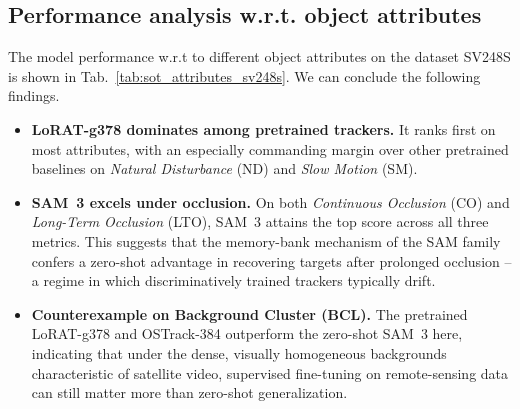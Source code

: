 \documentclass{article}
\begin{document}
\subsection{Performance analysis w.r.t. object attributes}
The model performance w.r.t to different object attributes on the dataset SV248S
is shown in Tab.~\ref{tab:sot_attributes_sv248s}. We can conclude the following
findings.
\begin{itemize}
    \item \textbf{LoRAT-g378 dominates among pretrained trackers.}
    It ranks first on most attributes, with an especially commanding margin
    over other pretrained baselines on \emph{Natural Disturbance} (ND) and
    \emph{Slow Motion} (SM).
    \item \textbf{SAM~3 excels under occlusion.} On both
    \emph{Continuous Occlusion} (CO) and \emph{Long-Term Occlusion} (LTO),
    SAM~3 attains the top score across all three metrics. This suggests
    that the memory-bank mechanism of the SAM family confers a zero-shot
    advantage in recovering targets after prolonged occlusion -- a regime
    in which discriminatively trained trackers typically drift.
    \item \textbf{Counterexample on Background Cluster (BCL).}
    The pretrained LoRAT-g378 and OSTrack-384 outperform the zero-shot
    SAM~3 here, indicating that under the dense, visually homogeneous
    backgrounds characteristic of satellite video, supervised fine-tuning
    on remote-sensing data can still matter more than zero-shot
    generalization.
\end{itemize}
\end{document}

